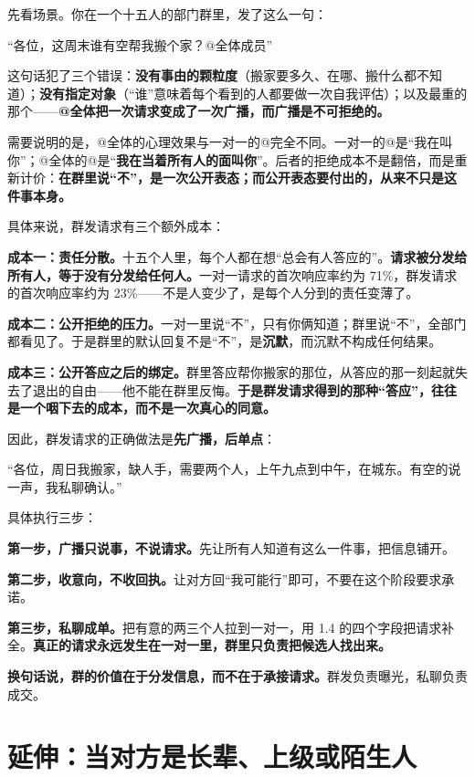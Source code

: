 先看场景。你在一个十五人的部门群里，发了这么一句：

\begin{mdquote}
“各位，这周末谁有空帮我搬个家？@全体成员”
\end{mdquote}

这句话犯了三个错误：\textbf{没有事由的颗粒度}（搬家要多久、在哪、搬什么都不知道）；\textbf{没有指定对象}（“谁”意味着每个看到的人都要做一次自我评估）；以及最重的那个——\textbf{@全体把一次请求变成了一次广播，而广播是不可拒绝的。}

需要说明的是，@全体的心理效果与一对一的@完全不同。一对一的@是“我在叫你”；@全体的@是“\textbf{我在当着所有人的面叫你}”。后者的拒绝成本不是翻倍，而是重新计价：\textbf{在群里说“不”，是一次公开表态；而公开表态要付出的，从来不只是这件事本身。}

具体来说，群发请求有三个额外成本：

\textbf{成本一：责任分散。}十五个人里，每个人都在想“总会有人答应的”。\textbf{请求被分发给所有人，等于没有分发给任何人。}一对一请求的首次响应率约为 71\%，群发请求的首次响应率约为 23\%——不是人变少了，是每个人分到的责任变薄了。

\textbf{成本二：公开拒绝的压力。}一对一里说“不”，只有你俩知道；群里说“不”，全部门都看见了。于是群里的默认回复不是“不”，是\textbf{沉默}，而沉默不构成任何结果。

\textbf{成本三：公开答应之后的绑定。}群里答应帮你搬家的那位，从答应的那一刻起就失去了退出的自由——他不能在群里反悔。\textbf{于是群发请求得到的那种“答应”，往往是一个咽下去的成本，而不是一次真心的同意。}

因此，群发请求的正确做法是\textbf{先广播，后单点}：

\begin{mdquote}
“各位，周日我搬家，缺人手，需要两个人，上午九点到中午，在城东。有空的说一声，我私聊确认。”
\end{mdquote}

具体执行三步：

\textbf{第一步，广播只说事，不说请求。}先让所有人知道有这么一件事，把信息铺开。

\textbf{第二步，收意向，不收回执。}让对方回“我可能行”即可，不要在这个阶段要求承诺。

\textbf{第三步，私聊成单。}把有意的两三个人拉到一对一，用 1.4 的四个字段把请求补全。\textbf{真正的请求永远发生在一对一里，群里只负责把候选人找出来。}

\textbf{换句话说，群的价值在于分发信息，而不在于承接请求。}群发负责曝光，私聊负责成交。

\section{延伸：当对方是长辈、上级或陌生人}

